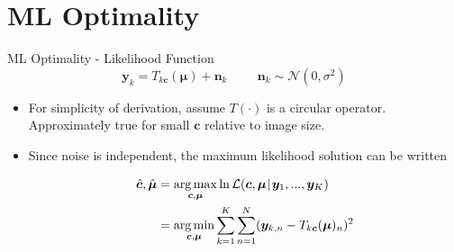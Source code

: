 \documentclass[10pt,xcolor=dvipsnames]{beamer}
\newcommand\lpipe{\mkern1.5mu{|}\mkern1.5mu}
\DeclareMathOperator*{\argmin}{\arg\min}
\DeclareMathOperator*{\argmax}{\arg\max}
\begin{document}

\section{ML Optimality}

\begin{frame}{ML Optimality - Likelihood Function}
  $$\bm{y}_k = T_{k\bm{c}}(\bm{\mu}) + \bm{n}_k \hspace{1cm} \bm{n}_k \sim \mathcal{N}(0, \sigma^2)$$
  \begin{itemize}
    \item For simplicity of derivation, assume $T(\cdot)$ is a circular operator.  Approximately true for small $\bm{c}$ relative to image size.
    \item Since noise is independent, the maximum likelihood solution can be written

    \begin{align}
      \hat{\bm{c}}, \hat{\bm{\mu}} &= \argmax_{\bm{c}, \bm{\mu}} \ln \mathcal{L}(\bm{c}, \bm{\mu} \lpipe \bm{y}_1, ..., \bm{y}_K) \nonumber \\
      &=\argmin_{\bm{c}, \bm{\mu}} \sum_{k=1}^K \sum_{n=1}^N (\bm{y}_{k,n} - T_{k\bm{c}}(\bm{\mu})_n)^2 \label{eq:min}
    \end{align}
  \end{itemize}
\end{frame}
\end{document}
